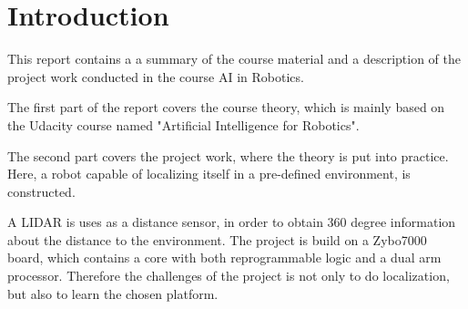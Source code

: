 \documentclass[Main]{subfiles}
\begin{document}
\chapter{Introduction} %
\label{cha:introduction}

This report contains a a summary of the course material and a description of the project work conducted in the course AI in Robotics.

The first part of the report covers the course theory, which is mainly based on the Udacity course named "Artificial Intelligence for Robotics".

The second part covers the project work, where the theory is put into practice.
Here, a robot capable of localizing itself in a pre-defined environment, is constructed.

A LIDAR is uses as a distance sensor, in order to obtain 360 degree information about the distance to the environment.
The project is build on a Zybo7000 board, which contains a core with both reprogrammable logic and a dual arm processor.
Therefore the challenges of the project is not only to do localization, but also to learn the chosen platform.

\end{document}
